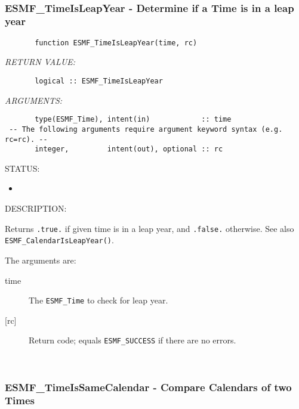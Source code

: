  
\mbox{}\hrulefill\ 
 
\subsubsection [ESMF\_TimeIsLeapYear] {ESMF\_TimeIsLeapYear - Determine if a Time is in a leap year}


 
\begin{verbatim}       function ESMF_TimeIsLeapYear(time, rc)
 \end{verbatim}{\em RETURN VALUE:}
\begin{verbatim}       logical :: ESMF_TimeIsLeapYear
 \end{verbatim}{\em ARGUMENTS:}
\begin{verbatim}       type(ESMF_Time), intent(in)            :: time
 -- The following arguments require argument keyword syntax (e.g. rc=rc). --
       integer,         intent(out), optional :: rc
 \end{verbatim}
{\sf STATUS:}
   \begin{itemize}
   \item{}
   \end{itemize}
  
{\sf DESCRIPTION:\\ }


       Returns {\tt .true.} if given time is in a leap year, and {\tt .false.}
       otherwise.  See also {\tt ESMF\_CalendarIsLeapYear()}.
  
       The arguments are:
       \begin{description}
       \item[time]
            The {\tt ESMF\_Time} to check for leap year.
       \item[{[rc]}]
            Return code; equals {\tt ESMF\_SUCCESS} if there are no errors.
       \end{description}
   
 
\mbox{}\hrulefill\ 
 
\subsubsection [ESMF\_TimeIsSameCalendar] {ESMF\_TimeIsSameCalendar - Compare Calendars of two Times}


